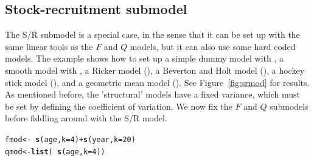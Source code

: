 \documentclass[a4paper,english,10pt]{article}\usepackage[]{graphicx}\usepackage[]{color}
\makeatletter
\newcommand{\hlnum}[1]{\textcolor[rgb]{0.686,0.059,0.569}{#1}}%
\newcommand{\hlopt}[1]{\textcolor[rgb]{0,0,0}{#1}}%
\newcommand{\hlstd}[1]{\textcolor[rgb]{0.345,0.345,0.345}{#1}}%
\newcommand{\hlkwb}[1]{\textcolor[rgb]{0.69,0.353,0.396}{#1}}%
\newcommand{\hlkwc}[1]{\textcolor[rgb]{0.333,0.667,0.333}{#1}}%
\newcommand{\hlkwd}[1]{\textcolor[rgb]{0.737,0.353,0.396}{\textbf{#1}}}%
\newenvironment{kframe}{%
 \def\at@end@of@kframe{}%
 \ifinner\ifhmode%
  \def\at@end@of@kframe{\end{minipage}}%
  \begin{minipage}{\columnwidth}%
 \fi\fi%
 \def\FrameCommand##1{\hskip\@totalleftmargin \hskip-\fboxsep
 \colorbox{shadecolor}{##1}\hskip-\fboxsep
     \hskip-\linewidth \hskip-\@totalleftmargin \hskip\columnwidth}%
 \MakeFramed {\advance\hsize-\width
   \@totalleftmargin\z@ \linewidth\hsize
   \@setminipage}}%
 {\par\unskip\endMakeFramed%
 \at@end@of@kframe}
\newenvironment{knitrout}{}{} %
\makeatother
\begin{document}
\subsection{Stock-recruitment submodel}

The S/R submodel is a special case, in the sense that it can be set up with the same linear tools as the $F$ and $Q$ models, but it can also use some hard coded models. The example shows how to set up a simple dummy model with , a smooth model with , a Ricker model (), a Beverton and Holt model (), a hockey stick model (), and a geometric mean model (). See Figure~\ref{fig:srmod} for results. As mentioned before, the 'structural' models have a fixed variance, which must be set by defining the coefficient of variation. We now fix the $F$ and $Q$ submodels before fiddling around with the S/R model.

\begin{knitrout}
\color{fgcolor}\begin{kframe}
\begin{alltt}
\hlstd{fmod} \hlkwb{<-} \hlopt{~}\hlkwd{s}\hlstd{(age,} \hlkwc{k} \hlstd{=} \hlnum{4}\hlstd{)} \hlopt{+} \hlkwd{s}\hlstd{(year,} \hlkwc{k} \hlstd{=} \hlnum{20}\hlstd{)}
\hlstd{qmod} \hlkwb{<-} \hlkwd{list}\hlstd{(}\hlopt{~}\hlkwd{s}\hlstd{(age,} \hlkwc{k} \hlstd{=} \hlnum{4}\hlstd{))}
\end{alltt}
\end{kframe}
\end{knitrout}
\end{document}
